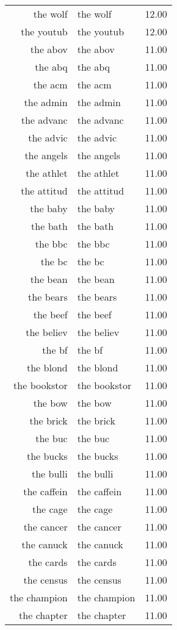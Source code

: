\begin{table}[ht]
\begin{tabular}{rlr}
  the wolf & the wolf & 12.00 \\ 
  the youtub & the youtub & 12.00 \\ 
  the abov & the abov & 11.00 \\ 
  the abq & the abq & 11.00 \\ 
  the acm & the acm & 11.00 \\ 
  the admin & the admin & 11.00 \\ 
  the advanc & the advanc & 11.00 \\ 
  the advic & the advic & 11.00 \\ 
  the angels & the angels & 11.00 \\ 
  the athlet & the athlet & 11.00 \\ 
  the attitud & the attitud & 11.00 \\ 
  the baby & the baby & 11.00 \\ 
  the bath & the bath & 11.00 \\ 
  the bbc & the bbc & 11.00 \\ 
  the bc & the bc & 11.00 \\ 
  the bean & the bean & 11.00 \\ 
  the bears & the bears & 11.00 \\ 
  the beef & the beef & 11.00 \\ 
  the believ & the believ & 11.00 \\ 
  the bf & the bf & 11.00 \\ 
  the blond & the blond & 11.00 \\ 
  the bookstor & the bookstor & 11.00 \\ 
  the bow & the bow & 11.00 \\ 
  the brick & the brick & 11.00 \\ 
  the buc & the buc & 11.00 \\ 
  the bucks & the bucks & 11.00 \\ 
  the bulli & the bulli & 11.00 \\ 
  the caffein & the caffein & 11.00 \\ 
  the cage & the cage & 11.00 \\ 
  the cancer & the cancer & 11.00 \\ 
  the canuck & the canuck & 11.00 \\ 
  the cards & the cards & 11.00 \\ 
  the census & the census & 11.00 \\ 
  the champion & the champion & 11.00 \\ 
  the chapter & the chapter & 11.00 \\ 

\end{tabular}
\end{table}
